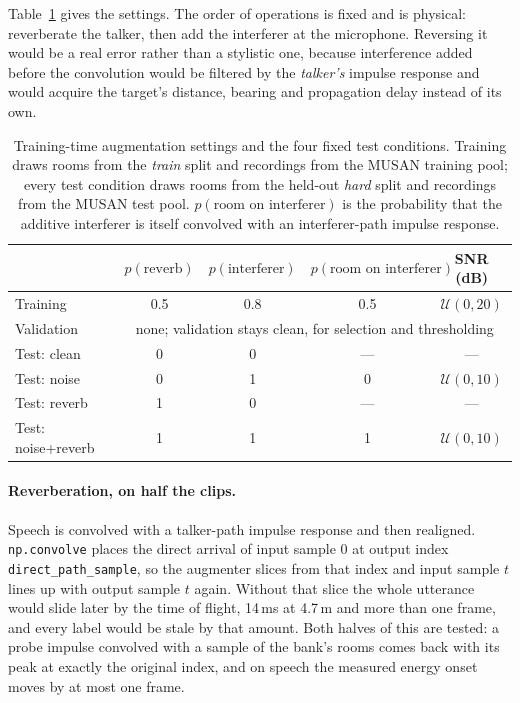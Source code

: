 \documentclass{article}
\begin{document}
Table~\ref{tab:augsettings} gives the settings. The order of operations is fixed and is physical: reverberate the talker, then add the interferer at the microphone. Reversing it would be a real error rather than a stylistic one, because interference added before the convolution would be filtered by the \emph{talker's} impulse response and would acquire the target's distance, bearing and propagation delay instead of its own.

\begin{table}[H]
    \centering
    \caption{Training-time augmentation settings and the four fixed test conditions. Training draws rooms from the \emph{train} split and recordings from the MUSAN training pool; every test condition draws rooms from the held-out \emph{hard} split and recordings from the MUSAN test pool. $p(\text{room on interferer})$ is the probability that the additive interferer is itself convolved with an interferer-path impulse response.}
    \label{tab:augsettings}
    \small
    \begin{tabular}{lcccc}
        \toprule
        & $p(\text{reverb})$ & $p(\text{interferer})$ & $p(\text{room on interferer})$ & SNR (dB) \\
        \midrule
        Training            & 0.5 & 0.8 & 0.5 & $\mathcal{U}(0, 20)$ \\
        Validation          & \multicolumn{4}{c}{none; validation stays clean, for selection and thresholding} \\
        \midrule
        Test: clean         & 0 & 0 & --- & --- \\
        Test: noise         & 0 & 1 & 0 & $\mathcal{U}(0, 10)$ \\
        Test: reverb        & 1 & 0 & --- & --- \\
        Test: noise+reverb  & 1 & 1 & 1 & $\mathcal{U}(0, 10)$ \\
        \bottomrule
    \end{tabular}
\end{table}

\paragraph{Reverberation, on half the clips.} Speech is convolved with a talker-path impulse response and then realigned. \texttt{np.convolve} places the direct arrival of input sample 0 at output index \texttt{direct\_path\_sample}, so the augmenter slices from that index and input sample $t$ lines up with output sample $t$ again. Without that slice the whole utterance would slide later by the time of flight, 14\,ms at 4.7\,m and more than one frame, and every label would be stale by that amount. Both halves of this are tested: a probe impulse convolved with a sample of the bank's rooms comes back with its peak at exactly the original index, and on speech the measured energy onset moves by at most one frame.
\end{document}
